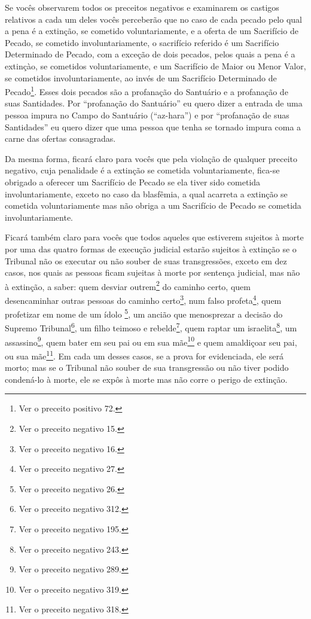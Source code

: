 Se vocês observarem todos os preceitos negativos e examinarem os
castigos relativos a cada um deles vocês perceberão que no caso de cada
pecado pelo qual a pena é a extinção, se cometido voluntariamente, e a
oferta de um Sacrifício de Pecado, se cometido involuntariamente, o
sacrifício referido é um Sacrifício Determinado de Pecado, com a exceção
de dois pecados, pelos quais a pena é a extinçào, se cometidos
voluntariamente, e um Sacrifício de Maior ou Menor Valor, se cometidos
involuntariamente, ao invés de um Sacrifício Determinado de
Pecado\footnote{Ver o preceito positivo 72.}. Esses dois pecados são a profanação do
Santuário e a profanação de suas Santidades. Por ``profanação do
Santuário'' eu quero dizer a entrada de uma pessoa impura no Campo do
Santuário (``az-hara'') e por ``profanação de suas Santidades'' eu quero
dizer que uma pessoa que tenha se tornado impura coma a carne das
ofertas consagradas.

Da mesma forma, ficará claro para vocês que pela violação de qualquer
preceito negativo, cuja penalidade é a extinção se cometida
voluntariamente, fica-se obrigado a oferecer um Sacrifício de Pecado se
ela tiver sido cometida involuntariamente, exceto no caso da blasfêmia,
a qual acarreta a extinção se cometida voluntariamente mas não obriga a
um Sacrifício de Pecado se cometida involuntariamente.

Ficará também claro para vocês que todos aqueles que estiverem sujeitos
à morte por uma das quatro formas de execução judicial estarão sujeitos
à extinção se o Tribunal não os executar ou não souber de suas
transgressões, exceto em dez casos, nos quais as pessoas ficam sujeitas
à morte por sentença judicial, mas não à extinção, a saber: quem desviar
outrem\footnote{Ver o preceito negativo 15.} do caminho certo, quem desencaminhar outras
pessoas do caminho certo\footnote{Ver o preceito negativo 16.}, num falso
profeta\footnote{Ver o preceito negativo 27.}, quem profetizar em nome de um ídolo \footnote{Ver o preceito negativo 26.}, um ancião
que menosprezar a decisão do Supremo Tribunal\footnote{Ver o preceito negativo 312.}, um
filho teimoso e rebelde\footnote{Ver o preceito negativo 195.}, quem raptar um
israelita\footnote{Ver o preceito negativo 243.}, um assassino\footnote{Ver o preceito negativo 289.},
quem bater em seu pai ou em sua mãe\footnote{Ver o preceito negativo 319.} e quem
amaldiçoar seu pai, ou sua mãe\footnote{Ver o preceito negativo 318.}. Em cada um desses
casos, se a prova for evidenciada, ele será morto; mas se o Tribunal não
souber de sua transgressão ou não tiver podido condená-lo à morte, ele
se expôs à morte mas não corre o perigo de extinção.


